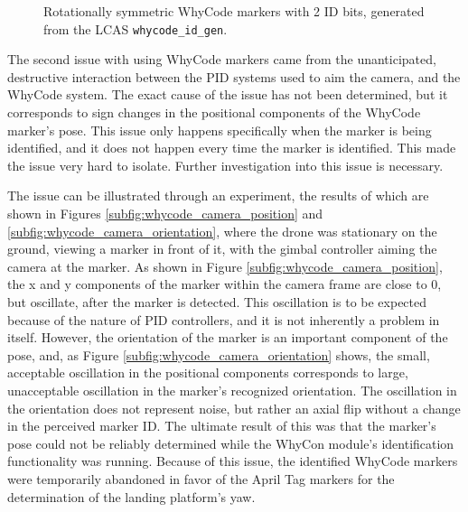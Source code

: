 \begin{figure}[ht]
\begin{subfigure}[b]{0.23\textwidth}
        \label{subfig:whycode_4}
    \end{subfigure}
    \caption{Rotationally symmetric WhyCode markers with 2 ID bits, generated from the LCAS \texttt{whycode\_id\_gen}.}
    \label{fig:whycode_rotational_symmetry}
\end{figure}

The second issue with using WhyCode markers came from the unanticipated, destructive interaction between the PID systems used to aim the camera, and the WhyCode system. The exact cause of the issue has not been determined, but it corresponds to sign changes in the positional components of the WhyCode marker's pose. This issue only happens specifically when the marker is being identified, and it does not happen every time the marker is identified. This made the issue very hard to isolate. Further investigation into this issue is necessary.

The issue can be illustrated through an experiment, the results of which are shown in Figures \ref{subfig:whycode_camera_position} and \ref{subfig:whycode_camera_orientation}, where the drone was stationary on the ground, viewing a marker in front of it, with the gimbal controller aiming the camera at the marker. As shown in Figure \ref{subfig:whycode_camera_position}, the x and y components of the marker within the camera frame are close to 0, but oscillate, after the marker is detected. This oscillation is to be expected because of the nature of PID controllers, and it is not inherently a problem in itself. However, the orientation of the marker is an important component of the pose, and, as Figure \ref{subfig:whycode_camera_orientation} shows, the small, acceptable oscillation in the positional components corresponds to large, unacceptable oscillation in the marker's recognized orientation. The oscillation in the orientation does not represent noise, but rather an axial flip without a change in the perceived marker ID. The ultimate result of this was that the marker's pose could not be reliably determined while the WhyCon module's identification functionality was running. Because of this issue, the identified WhyCode markers were temporarily abandoned in favor of the April Tag markers for the determination of the landing platform's yaw.

